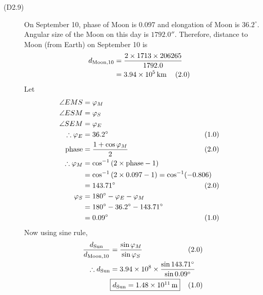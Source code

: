 \begin{description}
\item[(D2.9)]
On September 10, phase of Moon is 0.097 and elongation of Moon is $36.2^\circ$. Angular
size of the Moon on this day is $1792.0''$. Therefore, distance to Moon (from Earth) on
September 10 is
\begin{align*}
d_{\mathrm{Moon,10}} &= \frac{2\times1713\times206265}{1792.0}\\
 &= 3.94\times10^5\,\mathrm{km} & &\hspace{-2em}(2.0)
\end{align*}
Let
\begin{align*}
\angle EMS &= \varphi_M\\
\angle ESM &= \varphi_S\\
\angle SEM &= \varphi_E\\
\therefore \varphi_E &= 36.2^\circ & &\hspace{-2em}(1.0)\\
\mathrm{phase} &= \frac{1 + \cos\varphi_M}{2} & &\hspace{-2em}(2.0)\\
\therefore \varphi_M &= \cos^{-1}\left(2\times\mathrm{phase} - 1\right)\\
 &= \cos^{-1}\left(2\times0.097 - 1\right) = \cos^{-1}(-0.806)\\
 &= 143.71^\circ & &\hspace{-2em}(2.0)\\
\varphi_S &= 180^\circ - \varphi_E - \varphi_M\\
 &= 180^\circ - 36.2^\circ - 143.71^\circ\\
 &= 0.09^\circ & &\hspace{-2em}(1.0)
\end{align*}
Now using sine rule,
\begin{align*}
\frac{d_{\mathrm{Sun}}}{d_{\mathrm{Moon,10}}} &= \frac{\sin\varphi_M}{\sin\varphi_S}
 & &\hspace{-2em}(2.0)\\
\therefore d_{\mathrm{Sun}} &= 3.94\times10^8\times\frac{\sin 143.71^\circ}{\sin 0.09^\circ}\\
&\fbox{$d_{\mathrm{Sun}} = 1.48\times10^{11}\,\mathrm{m}$} & &\hspace{-2em}(1.0)
\end{align*}
\end{description}

